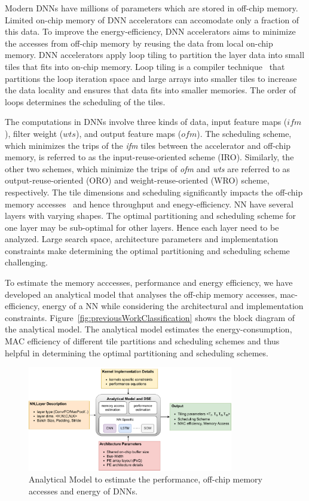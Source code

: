 \documentclass[a4paper,10pt]{article}
\begin{document}
Modern DNNs have millions of parameters which are stored in off-chip memory. Limited on-chip memory of DNN accelerators can accomodate only a fraction of this data. To improve the energy-efficiency, DNN accelerators aims to minimize the accesses from off-chip memory by reusing the data from local on-chip memory. DNN accelerators apply loop tiling to partition the layer data into small tiles that fits into on-chip memory. Loop tiling is a compiler  technique~\cite{aho2006compilers} that partitions the loop iteration space and large arrays into smaller tiles to increase the data locality and ensures that data fits into smaller memories. The order of loops determines the scheduling of the tiles. 

The computations in DNNs involve three kinds of data, input feature maps ($ifm$), filter weight ($wts$), and output feature maps ($ofm$). The scheduling scheme, which minimizes the trips of the \textit{ifm} tiles between the accelerator and off-chip memory, is referred to as the input-reuse-oriented scheme (IRO). Similarly, the other two schemes, which minimize the trips of \textit{ofm} and \textit{wts} are referred to as output-reuse-oriented (ORO) and weight-reuse-oriented (WRO) scheme, respectively. The tile dimensions and scheduling significantly impacts the off-chip memory accesses~\cite{zhang2015optimizing, Li2018SmartShuttleOO} and hence throughput and enegy-efficiency.  NN have several layers with varying shapes. The optimal partitioning and scheduling scheme for one layer may be sub-optimal for other layers. Hence each layer need to be analyzed. Large search space, architecture parameters and implementation constraints make determining the optimal partitioning and scheduling scheme challenging.

To estimate the memory acccesses, performance and energy efficiency, we have developed an analytical model that analyses the off-chip memory accesses, mac-efficiency, energy of a NN while considering the architectural and implementation constraints. Figure~\ref{fig:previousWorkClassification} shows the block diagram of the analytical model. The analytical model estimates the energy-consumption, MAC efficiency of different tile partitions and scheduling schemes and thus helpful in determining the optimal partitioning and scheduling schemes.
\begin{figure}[!htb]
	\centering
	\includegraphics[width=0.8\textwidth]{analyticalModel}
	\caption{Analytical Model to estimate the performance, off-chip memory accesses and energy of DNNs.}
	\label{fig:analyticalModel}
\end{figure}
\end{document}
